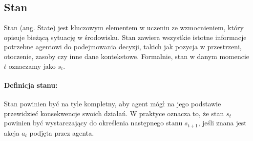 \subsection{Stan}

Stan (ang. State) jest kluczowym elementem w uczeniu ze wzmocnieniem, który opisuje bieżącą sytuację w środowisku. Stan zawiera wszystkie istotne informacje potrzebne agentowi do podejmowania decyzji, takich jak pozycja w przestrzeni, otoczenie, zasoby czy inne dane kontekstowe. Formalnie, stan w danym momencie \( t \) oznaczamy jako \( s_t \).

\paragraph{Definicja stanu:}
Stan powinien być na tyle kompletny, aby agent mógł na jego podstawie przewidzieć konsekwencje swoich działań. W praktyce oznacza to, że stan \( s_t \) powinien być wystarczający do określenia następnego stanu \( s_{t+1} \), jeśli znana jest akcja \( a_t \) podjęta przez agenta.

